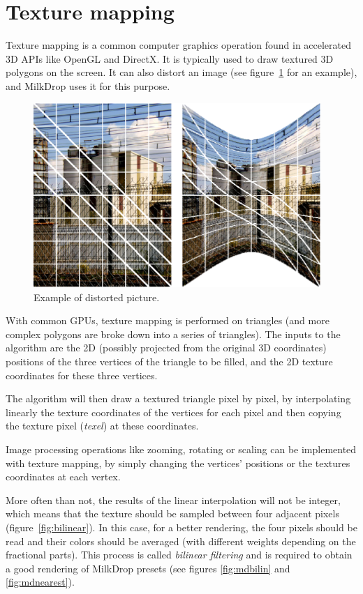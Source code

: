 \documentclass[a4paper,11pt]{kthesis}
\begin{document}
\section{Texture mapping}
\label{sec:tm}
Texture mapping is a common computer graphics operation found in accelerated 3D APIs like OpenGL and DirectX. It is typically used to draw textured 3D polygons on the screen. It can also distort an image (see figure~\ref{fig:distorted} for an example), and MilkDrop uses it for this purpose.

\begin{figure}
\centering
\includegraphics[height=70mm]{tesselsanofi.eps}
\caption{Example of distorted picture.}
\label{fig:distorted}
\end{figure}

With common GPUs, texture mapping is performed on triangles (and more complex polygons are broke down into a series of triangles). The inputs to the algorithm are the 2D (possibly projected from the original 3D coordinates) positions of the three vertices of the triangle to be filled, and the 2D texture coordinates for these three vertices.

The algorithm will then draw a textured triangle pixel by pixel, by interpolating linearly the texture coordinates of the vertices for each pixel and then copying the texture pixel (\textit{texel}) at these coordinates.

Image processing operations like zooming, rotating or scaling can be implemented with texture mapping, by simply changing the vertices' positions or the textures coordinates at each vertex.

More often than not, the results of the linear interpolation will not be integer, which means that the texture should be sampled between four adjacent pixels (figure~\ref{fig:bilinear}). In this case, for a better rendering, the four pixels should be read and their colors should be averaged (with different weights depending on the fractional parts). This process is called \textit{bilinear filtering} and is required to obtain a good rendering of MilkDrop presets (see figures \ref{fig:mdbilin} and \ref{fig:mdnearest}).
\end{document}
